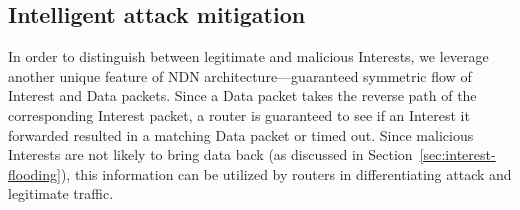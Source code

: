 


\subsection{Intelligent attack mitigation}
\label{sec:intelligent mitigating}


In order to distinguish between legitimate and malicious Interests, we leverage another unique feature of  NDN architecture---guaranteed symmetric flow of Interest and Data packets. Since a Data packet takes the reverse path of the corresponding Interest packet, a router is guaranteed to see if an Interest it forwarded resulted in a matching Data packet or timed out. %
Since malicious Interests are not likely to bring data back (as discussed in Section~\ref{sec:interest-flooding}), this information can be utilized by routers in differentiating attack and legitimate traffic.  %

